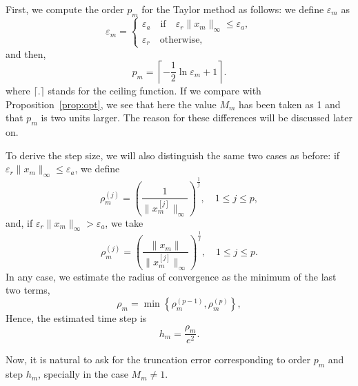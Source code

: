 \documentclass[12pt,twoside]{article}
\begin{document}
First, we compute the order $p_m$ for the Taylor method as follows: we
define $\varepsilon_m$ as
\begin{equation}
\varepsilon_m=\left\{
\begin{array}{l}
\varepsilon_a\quad\mbox{if}\quad
  \varepsilon_r\|x_m\|_{\infty}\le\varepsilon_a,\\
\varepsilon_r\quad\mbox{otherwise},
\end{array}
\right.
\label{eq:eps_m}
\end{equation}
and then,
\begin{equation}
p_m=\left\lceil-\frac{1}{2}\ln\varepsilon_m+1\right\rceil.
\label{eq:p_m}
\end{equation}
where $\lceil.\rceil$ stands for the ceiling function. If we compare
with Proposition~\ref{prop:opt}, we see that here the value $M_m$ has
been taken as 1 and that $p_m$ is two units larger.  The reason for
these differences will be discussed later on.

To derive the step size, we will also distinguish the same two cases
as before: if $\varepsilon_r\|x_m\|_{\infty}\le\varepsilon_a$, we
define
\begin{equation}
\rho_m^{(j)}=
\left(\frac{1}{\|x_m^{[j]}\|_{\infty}}\right)^{\frac{1}{j}},
\quad 1\le j\le p,
\label{eq:e-rho_a}
\end{equation}
and, if $\varepsilon_r\|x_m\|_{\infty}>\varepsilon_a$, we take
\begin{equation}
\rho_m^{(j)}=
\left(\frac{\|x_m\|}{\|x_m^{[j]}\|_{\infty}}\right)^{\frac{1}{j}},
\quad 1\le j\le p.
\label{eq:e-rho_r}
\end{equation}
In any case, we estimate the radius of convergence as the minimum of
the last two terms,
\begin{equation}
\rho_m=\min\left\{\rho_m^{(p-1)},\rho_m^{(p)}\right\},
\label{eq:rho_m}
\end{equation}
Hence, the estimated time step is
\begin{equation}
h_m=\frac{\rho_m}{e^2}.
\label{eq:h_m}
\end{equation}

Now, it is natural to ask for the truncation error corresponding to
order $p_m$ and step $h_m$, specially in the case $M_m\ne 1$.
\end{document}
